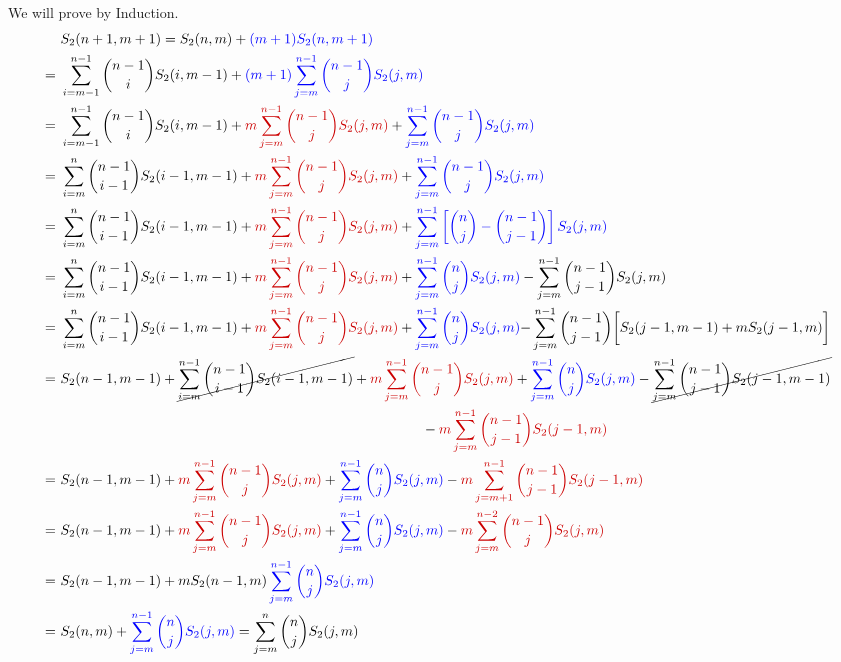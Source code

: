 \begin{alg-proof}We will prove by Induction. 
	\begin{align*}
		& S_2(n+1,m+1)=\mathcolor{black}{S_2(n,m)}+\mathcolor{blue}{(m+1)S_2(n,m+1)} \\
		             =\ & \mathcolor{black}{\sum_{i=m-1}^{n-1}\binom{n-1}{i}S_2(i,m-1)} +\mathcolor{blue}{ (m+1)\sum_{j=m}^{n-1}\binom{n-1}{j}S_2(j,m)}\\
		             =\ & \mathcolor{black}{\sum_{i=m-1}^{n-1}\binom{n-1}{i}S_2(i,m-1)}+\mathcolor{red!80!black}{m\sum_{j=m}^{n-1}\binom{n-1}{j}S_2(j,m)}+\mathcolor{blue}{\sum_{j=m}^{n-1}\binom{n-1}{j}S_2(j,m)}\\
		             =\ & \sum_{i=m}^{n}\binom{n-1}{i-1}S_2(i-1,m-1)+\mathcolor{red!80!black}{m\sum_{j=m}^{n-1}\binom{n-1}{j}S_2(j,m)}+\mathcolor{blue}{\sum_{j=m}^{n-1}\binom{n-1}{j}S_2(j,m)}\\
		             =\ &  \sum_{i=m}^{n}\binom{n-1}{i-1}S_2(i-1,m-1) + \mathcolor{red!80!black}{m\sum_{j=m}^{n-1}\binom{n-1}{j}S_2(j,m)}+\mathcolor{blue}{\sum_{j=m}^{n-1}\lt[\binom{n}j-\binom{n-1}{j-1}\rt]S_2(j,m)}\\
		             =\ &  \sum_{i=m}^{n}\binom{n-1}{i-1}S_2(i-1,m-1) + \mathcolor{red!80!black}{m\sum_{j=m}^{n-1}\binom{n-1}{j}S_2(j,m)}+\mathcolor{blue}{\sum_{j=m}^{n-1}\binom{n}jS_2(j,m)}-\sum_{j=m}^{n-1}\binom{n-1}{j-1}S_2(j,m)\\
		             =\ &  \sum_{i=m}^{n}\binom{n-1}{i-1}S_2(i-1,m-1) + \mathcolor{red!80!black}{m\sum_{j=m}^{n-1}\binom{n-1}{j}S_2(j,m)}+\mathcolor{blue}{\sum_{j=m}^{n-1}\binom{n}jS_2(j,m)} {-\sum_{j=m}^{n-1}\binom{n-1}{j-1}\bigg[S_2(j-1,m-1)+mS_2(j-1,m)\bigg]}\\
		             =\ & S_2(n-1,m-1)+\cancel{ \sum_{i=m}^{n-1}\binom{n-1}{i-1}S_2(i-1,m-1)} + \mathcolor{red!80!black}{m\sum_{j=m}^{n-1}\binom{n-1}{j}S_2(j,m)}+\mathcolor{blue}{\sum_{j=m}^{n-1}\binom{n}jS_2(j,m)}-\cancel{\sum_{j=m}^{n-1}\binom{n-1}{j-1}S_2(j-1,m-1)}\\
		             & \hskip0.75\textwidth-\mathcolor{red!80!black}{m\sum_{j=m}^{n-1}\binom{n-1}{j-1}S_2(j-1,m)}\\
		             =\ &  S_2(n-1,m-1)+\mathcolor{red!80!black}{m\sum_{j=m}^{n-1}\binom{n-1}{j}S_2(j,m)} + \mathcolor{blue}{\sum_{j=m}^{n-1}\binom{n}jS_2(j,m)}-\mathcolor{red!80!black}{m\sum_{j=m+1}^{n-1}\binom{n-1}{j-1}S_2(j-1,m)}\\
		             =\ &  S_2(n-1,m-1) + \mathcolor{red!80!black}{m\sum_{j=m}^{n-1}\binom{n-1}{j}S_2(j,m)}+\mathcolor{blue}{\sum_{j=m}^{n-1}\binom{n}jS_2(j,m)}-\mathcolor{red!80!black}{m\sum_{j=m}^{n-2}\binom{n-1}{j}S_2(j,m)}\\
		             =\ &  S_2(n-1,m-1)+ {mS_2(n-1,m)}\mathcolor{blue}{\sum_{j=m}^{n-1}\binom{n}jS_2(j,m)}\\
		             =\ & S_2(n,m)+ \mathcolor{blue}{\sum_{j=m}^{n-1}\binom{n}jS_2(j,m)}= \sum_{j=m}^{n}\binom{n}jS_2(j,m)
	\end{align*}
\end{alg-proof}
